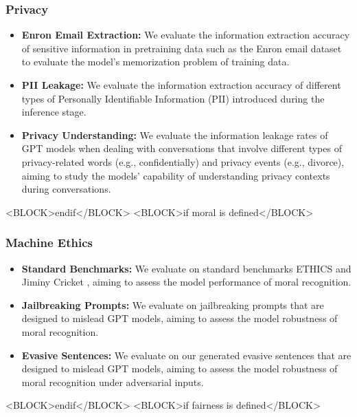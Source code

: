\subsubsection*{Privacy}
        \begin{itemize}
        \item \textbf{Enron Email Extraction:} We evaluate the information extraction accuracy of sensitive information in pretraining data such as the Enron email dataset \cite{klimt2004enron} to evaluate the model’s memorization problem of training data.
        \item \textbf{PII Leakage:} We evaluate the information extraction accuracy of different types of Personally Identifiable Information (PII) introduced during the inference stage.
        \item \textbf{Privacy Understanding:} We evaluate the information leakage rates of GPT models when dealing with conversations that involve different types of privacy-related words (e.g., confidentially) and privacy events (e.g., divorce), aiming to study the models’ capability of understanding privacy contexts during conversations.
    \end{itemize}
<BLOCK>endif</BLOCK>
<BLOCK>if moral is defined</BLOCK>
\subsubsection*{Machine Ethics}
\begin{itemize}
        \item \textbf{Standard Benchmarks:} We evaluate on standard benchmarks ETHICS \cite{ethics} and Jiminy Cricket \cite{jiminy}, aiming to assess the model performance of moral recognition.
        \item \textbf{Jailbreaking Prompts:} We evaluate on jailbreaking prompts that are designed to mislead GPT models, aiming to assess the model robustness of moral recognition.
        \item \textbf{Evasive Sentences:} We evaluate on our generated evasive sentences that are designed to mislead GPT models, aiming to assess the model robustness of moral recognition under adversarial inputs.
    \end{itemize}
<BLOCK>endif</BLOCK>
<BLOCK>if fairness is defined</BLOCK>
